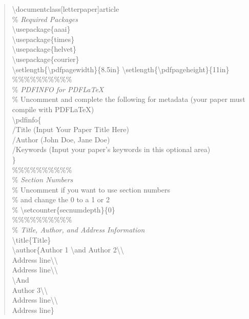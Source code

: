 \documentclass[letterpaper]{article}
\begin{document}
	
	\begin{quote}
		\begin{small}
			\textbackslash documentclass[letterpaper]{article}\\
			\% \textit{Required Packages}\\
			\textbackslash usepackage\{aaai\}\\
			\textbackslash usepackage\{times\}\\
			\textbackslash usepackage\{helvet\}\\
			\textbackslash usepackage\{courier\}\\
			\textbackslash setlength\{\textbackslash pdfpagewidth\}\{8.5in\}
			\textbackslash setlength\{\textbackslash pdfpageheight\}\{11in\}\\
			\%\%\%\%\%\%\%\%\%\%\\
			\% \textit{PDFINFO for PDF\LaTeX{}}\\
			\% Uncomment and complete the following for metadata (your paper must compile with PDF\LaTeX{})\\
			\textbackslash pdfinfo\{\\
			/Title (Input Your Paper Title Here)\\
			/Author (John Doe, Jane Doe)\\
			/Keywords (Input your paper's keywords in this optional area)\\
			\}\\
			\%\%\%\%\%\%\%\%\%\%\\
			\% \textit{Section Numbers}\\
			\% Uncomment if you want to use section numbers\\
			\% and change the 0 to a 1 or 2\\
			\% \textbackslash setcounter\{secnumdepth\}\{0\}\\
			\%\%\%\%\%\%\%\%\%\%\\
			\% \textit{Title, Author, and Address Information}\\
			\textbackslash title\{Title\}\\
			\textbackslash author\{Author 1 \textbackslash and Author 2\textbackslash\textbackslash \\ 
			Address line\textbackslash\textbackslash\\ Address line\textbackslash\textbackslash \\
			\textbackslash And\\
			Author 3\textbackslash\textbackslash\\ Address line\textbackslash\textbackslash\\ Address line\}\\

\end{small}
\end{quote}
\end{document}
